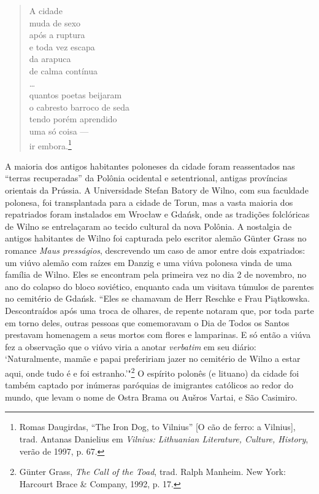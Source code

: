 \begin{verse}
A cidade\\
muda de sexo\\
após a ruptura\\
e toda vez escapa\\
da arapuca\\
de calma contínua\\
\ldots{}\\
quantos poetas beijaram\\
o cabresto barroco de seda\\
tendo porém aprendido\\
uma só coisa ---\\
ir embora.\footnote{Romas Daugirdas, ``The Iron Dog,
  to Vilnius'' {[}O cão de ferro: a Vilnius{]}, trad. Antanas Danielius em \emph{Vilnius: Lithuanian
  Literature, Culture, History}, verão de 1997, p. 67.}
\end{verse}

A maioria dos antigos habitantes poloneses da cidade foram reassentados
nas ``terras recuperadas'' da Polônia ocidental e setentrional, antigas
províncias orientais da Prússia. A Universidade Stefan Batory de Wilno,
com sua faculdade polonesa, foi transplantada para a cidade de Torun,
mas a vasta maioria dos repatriados foram instalados em Wrocław e
Gdańsk, onde as tradições folclóricas de Wilno se entrelaçaram ao tecido
cultural da nova Polônia. A nostalgia de antigos habitantes de Wilno foi
capturada pelo escritor alemão Günter Grass no romance \emph{Maus
presságios}, descrevendo um caso de amor entre dois expatriados: um
viúvo alemão com raízes em Danzig e uma viúva polonesa vinda de uma
família de Wilno. Eles se encontram pela primeira vez no dia 2 de
novembro, no ano do colapso do bloco soviético, enquanto cada um
visitava túmulos de parentes no cemitério de Gdańsk. ``Eles se chamavam
de Herr Reschke e Frau Piątkowska. Descontraídos após uma troca de
olhares, de repente notaram que, por toda parte em torno deles, outras
pessoas que comemoravam o Dia de Todos os Santos prestavam homenagem a
seus mortos com flores e lamparinas. E só então a viúva fez a observação
que o viúvo viria a anotar \emph{verbatim} em seu diário: `Naturalmente,
mamãe e papai prefeririam jazer no cemitério de Wilno a estar aqui, onde
tudo é e foi estranho.'"\footnote{Günter Grass, \emph{The Call of the
  Toad}, trad. Ralph Manheim. New York: Harcourt Brace \& Company, 1992,
  p. 17.} O espírito polonês (e lituano) da cidade foi também captado
por inúmeras paróquias de imigrantes católicos ao redor do mundo, que
levam o nome de Ostra Brama ou Aušros Vartai, e São Casimiro.

